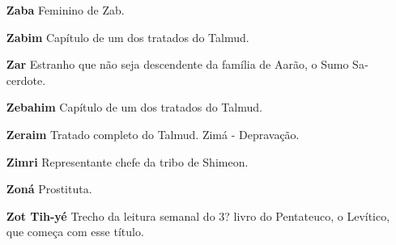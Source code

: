\begin{itemize}
\item[\textbf{Zaba}] Feminino de Zab.

\item[\textbf{Zabim}] Capítulo de um dos tratados do Talmud.

\item[\textbf{Zar}] Estranho que não seja descen­dente da família de Aarão, o
Sumo Sa­cerdote.

\item[\textbf{Zebahim}] Capítulo de um dos trata­dos do Talmud.

\item[\textbf{Zeraim}] Tratado completo do Talmud. Zimá - Depravação.

\item[\textbf{Zimri}] Representante chefe da tribo de Shimeon.

\item[\textbf{Zoná}] Prostituta.

\item[\textbf{Zot Tih-yé}] Trecho da leitura sema­nal do 3? livro do
Pentateuco, o Leví­tico, que começa com esse título.
\endgrouping %
\end{itemize}